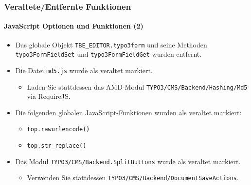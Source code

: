\begin{frame}[fragile]
	\frametitle{Veraltete/Entfernte Funktionen}
	\framesubtitle{JavaScript Optionen und Funktionen (2)}

	\begin{itemize}

		\item Das globale Objekt \texttt{TBE\_EDITOR.typo3form} und seine Methoden \texttt{typo3FormFieldSet} und 
			\texttt{typo3FormFieldGet} wurden entfernt.

		\item Die Datei \texttt{md5.js} wurde als veraltet markiert.

			\begin{itemize}\smaller
				\item[\ding{228}] Laden Sie stattdessen das AMD-Modul \texttt{TYPO3/CMS/Backend/Hashing/Md5} via RequireJS.
			\end{itemize}\normalsize

		\item Die folgenden globalen JavaScript-Funktionen wurden als veraltet markiert:

		\begin{itemize}
			\item \texttt{top.rawurlencode()}
			\item \texttt{top.str\_replace()}
		\end{itemize}

		\item Das Modul \texttt{TYPO3/CMS/Backend.SplitButtons} wurde als veraltet markiert.

			\begin{itemize}\smaller
				\item[\ding{228}] Verwenden Sie stattdessen \texttt{TYPO3/CMS/Backend/DocumentSaveActions}.
			\end{itemize}\normalsize

 	\end{itemize}

\end{frame}


